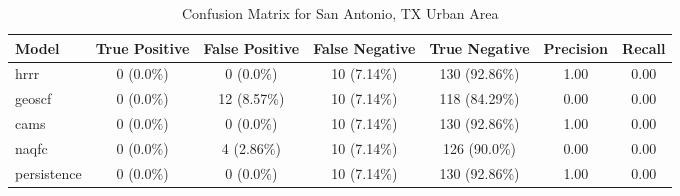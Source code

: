 \begin{table}[h!]
\centering
\begin{tabular}{lcccccc}
\hline
Model & True Positive & False Positive & False Negative & True Negative & Precision & Recall\\ \hline
hrrr & 0 (0.0\%) & 0 (0.0\%) & 10 (7.14\%) & 130 (92.86\%) & \cellcolor{green!25}1.00 & \cellcolor{green!25}0.00 \\ 
geoscf & 0 (0.0\%) & 12 (8.57\%) & 10 (7.14\%) & 118 (84.29\%) & \cellcolor{red!25}0.00 & \cellcolor{green!25}0.00 \\ 
cams & 0 (0.0\%) & 0 (0.0\%) & 10 (7.14\%) & 130 (92.86\%) & \cellcolor{green!25}1.00 & \cellcolor{green!25}0.00 \\ 
naqfc & 0 (0.0\%) & 4 (2.86\%) & 10 (7.14\%) & 126 (90.0\%) & \cellcolor{red!25}0.00 & \cellcolor{green!25}0.00 \\ 
persistence & 0 (0.0\%) & 0 (0.0\%) & 10 (7.14\%) & 130 (92.86\%) & 1.00 & 0.00 \\ 
\hline
\end{tabular}
\caption{Confusion Matrix for San Antonio, TX Urban Area}
\end{table}
